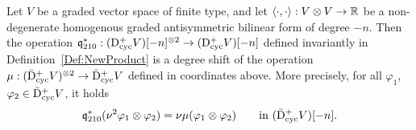 \documentclass[\MainFolder/Text.tex]{subfiles}
\begin{document}
\begin{Proposition}\label{Prop:EqOfDefCool}
Let $V$ be a graded vector space of finite type, and let $\langle \cdot,\cdot\rangle: V\otimes V \rightarrow \mathbb{R}$ be a non-degenerate homogenous graded antisymmetric bilinear form of degree $-n$. Then the operation $\mathfrak{q}_{210}^*: (\mathrm{D}^+_{\mathrm{cyc}} V)[-n]^{\otimes 2} \rightarrow (\mathrm{D}^+_{\mathrm{cyc}} V)[-n]$ defined invariantly in Definition~\ref{Def:NewProduct} is a degree shift of the operation $\mu: (\bar{\mathrm{D}}^+_{\mathrm{cyc}} V)^{\otimes 2} \rightarrow \bar{\mathrm{D}}^+_{\mathrm{cyc}} V$ defined in coordinates above. More precisely, for all $\varphi_1$, $\varphi_2 \in \bar{\mathrm{D}}^+_{\mathrm{cyc}} V$, it holds
$$ \mathfrak{q}_{210}^*(\mathbb{\nu}^2 \varphi_1 \otimes \varphi_2) = \mathbb{\nu} \mu(\varphi_1 \otimes \varphi_2)\qquad\text{in }(\bar{\mathrm{D}}^+_{\mathrm{cyc}} V)[-n].$$
\end{Proposition}
\end{document}
